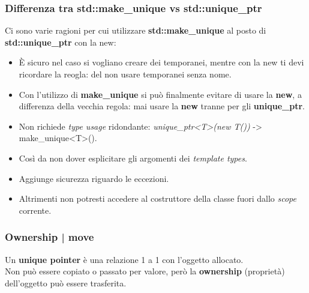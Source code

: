 \subsubsection{Differenza tra std::make\_unique vs std::unique\_ptr}

\textsf{\small Ci sono varie ragioni per cui utilizzare \textbf{std::make\_unique} al posto di \textbf{std::unique\_ptr} con la new: } \\

\begin{itemize}
	\item \textsf{\small È sicuro nel caso si vogliano creare dei temporanei, mentre con la new ti devi ricordare la reogla: del non usare temporanei senza nome. } 
	\item \textsf{\small Con l'utilizzo di \textbf{make\_unique} si può finalmente evitare di usare la \textbf{new}, a differenza della vecchia regola: mai usare la \textbf{new} tranne per gli \textbf{unique\_ptr}.} 
	\item \textsf{\small Non richiede \emph{type usage} ridondante: \emph{unique\_ptr<T>(new T())} -> make\_unique<T>().} \\
	\item \textsf{\small Così da non dover esplicitare gli argomenti dei \emph{template types}.}
	\item \textsf{\small Aggiunge sicurezza riguardo le eccezioni.}
	\item \textsf{\small Altrimenti non potresti accedere al costruttore della classe fuori dallo \emph{scope} corrente.}
\end{itemize}

\subsubsection{Ownership | move}

\textsf{\small Un \textbf{unique pointer} è una relazione 1 a 1 con l'oggetto allocato.} \\

\textsf{\small Non può essere copiato o passato per valore, però la \textbf{ownership} (proprietà) dell'oggetto può essere trasferita.} \\

